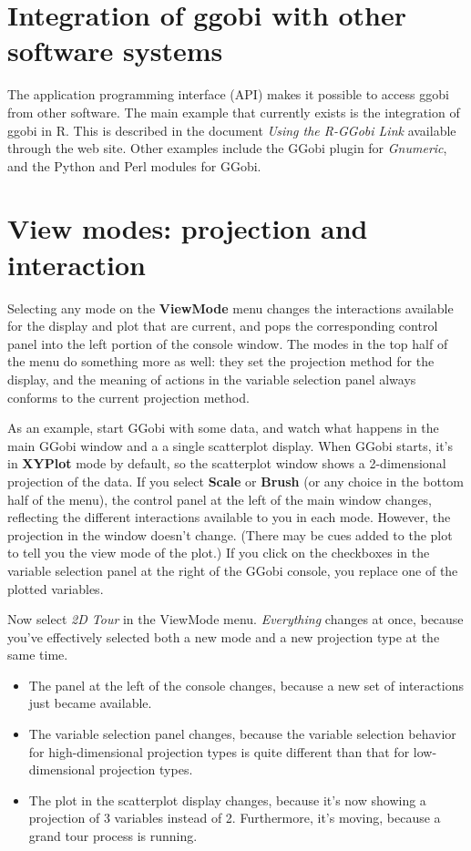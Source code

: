 \documentclass[11pt]{article}
\begin{document}
\section{Integration of ggobi with other software systems}
\label{slbl:Integration}

The application programming interface (API) makes it possible to
access ggobi from other software. The main example that currently
exists is the integration of ggobi in R. This is described in the
document {\em Using the R-GGobi Link} available through the web site.
Other examples include the GGobi plugin for \textit{Gnumeric}, and the
Python and Perl modules for GGobi.


\section{View modes: projection and interaction}
\label{slbl:ViewModes}

Selecting any mode on the {\bf ViewMode} menu changes the interactions
available for the display and plot that are current, and pops the
corresponding control panel into the left portion of the console
window.  The modes in the top half of the menu do something more as
well:  they set the projection method for the display, and the meaning
of actions in the variable selection panel always conforms to the current
projection method.

As an example, start GGobi with some data, and watch what happens in
the main GGobi window and a a single scatterplot display.   When
GGobi starts, it's in {\bf XYPlot} mode by default, so the
scatterplot window shows a 2-dimensional projection of the data.  If
you select {\bf Scale} or {\bf Brush} (or any choice in the bottom
half of the menu), the control panel at the left of the main window
changes, reflecting the different interactions available to you in
each mode.  However, the projection in the window doesn't change.
(There may be cues added to the plot to tell you the view mode of the
plot.) If you click on the checkboxes in the variable selection panel
at the right of the GGobi console, you replace one of the plotted
variables.

Now select {\em 2D Tour} in the ViewMode menu.  {\em Everything}
changes at once, because you've effectively selected both a new mode and
a new projection type at the same time.
\begin{itemize}
\itemsep 0em
\item The panel at the left of the console changes, because a
      new set of interactions just became available.
\item The variable selection panel changes, because the variable
      selection behavior for high-dimensional projection types is
      quite different than that for low-dimensional projection types.
\item The plot in the scatterplot display changes, because it's
      now showing a projection of 3 variables instead of 2.  Furthermore,
      it's moving, because a grand tour process is running.
\end{itemize}
\end{document}
